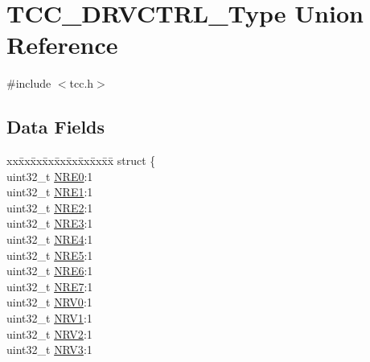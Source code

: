 \hypertarget{union_t_c_c___d_r_v_c_t_r_l___type}{}\section{T\+C\+C\+\_\+\+D\+R\+V\+C\+T\+R\+L\+\_\+\+Type Union Reference}
\label{union_t_c_c___d_r_v_c_t_r_l___type}


{\ttfamily \#include $<$tcc.\+h$>$}

\subsection*{Data Fields}
\begin{DoxyCompactItemize}
\item 
\begin{tabbing}
xx\=xx\=xx\=xx\=xx\=xx\=xx\=xx\=xx\=\kill
struct \{\\
\>uint32\_t \mbox{\hyperlink{union_t_c_c___d_r_v_c_t_r_l___type_ad38a51fbf1eab30a371b2b2da3e03d06}{NRE0}}:1\\
\>uint32\_t \mbox{\hyperlink{union_t_c_c___d_r_v_c_t_r_l___type_ad3efe23c17aeef7b38934f4ca28c3e60}{NRE1}}:1\\
\>uint32\_t \mbox{\hyperlink{union_t_c_c___d_r_v_c_t_r_l___type_a0b2d765a8cdaede04dee1b7556dc35ad}{NRE2}}:1\\
\>uint32\_t \mbox{\hyperlink{union_t_c_c___d_r_v_c_t_r_l___type_ac8c550ce41433c1da406dbd8cf01fd13}{NRE3}}:1\\
\>uint32\_t \mbox{\hyperlink{union_t_c_c___d_r_v_c_t_r_l___type_a40ad723486b72a57c6dd258a563eaa06}{NRE4}}:1\\
\>uint32\_t \mbox{\hyperlink{union_t_c_c___d_r_v_c_t_r_l___type_af051de4f669851eba056f561152634de}{NRE5}}:1\\
\>uint32\_t \mbox{\hyperlink{union_t_c_c___d_r_v_c_t_r_l___type_ab60ecba4ce4739ba62a53ad147a02ea1}{NRE6}}:1\\
\>uint32\_t \mbox{\hyperlink{union_t_c_c___d_r_v_c_t_r_l___type_accf70060c1f3ab7724f4a65c324644ec}{NRE7}}:1\\
\>uint32\_t \mbox{\hyperlink{union_t_c_c___d_r_v_c_t_r_l___type_acfe951224efe83f269fb5f2e05f29e34}{NRV0}}:1\\
\>uint32\_t \mbox{\hyperlink{union_t_c_c___d_r_v_c_t_r_l___type_a6d81389d1e04abb812e5991a01d68240}{NRV1}}:1\\
\>uint32\_t \mbox{\hyperlink{union_t_c_c___d_r_v_c_t_r_l___type_a3e9968c748d605a1a7323dbf4fe356b6}{NRV2}}:1\\
\>uint32\_t \mbox{\hyperlink{union_t_c_c___d_r_v_c_t_r_l___type_a065e514c6886ac6a8f452d4ef3beccf9}{NRV3}}:1\\

\end{tabbing}
\end{DoxyCompactItemize}
